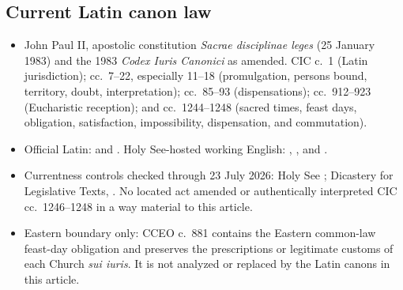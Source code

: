 \subsection*{Current Latin canon law}

{\fontsize{8.6}{9.6}\selectfont
\begin{itemize}[itemsep=0pt,parsep=0pt,topsep=0.05em]
\item John Paul II, apostolic constitution \emph{Sacrae disciplinae leges} (25 January 1983) and the 1983 \emph{Codex Iuris Canonici} as amended. CIC c.~1 (Latin jurisdiction); cc.~7--22, especially 11--18 (promulgation, persons bound, territory, doubt, interpretation); cc.~85--93 (dispensations); cc.~912--923 (Eucharistic reception); and cc.~1244--1248 (sacred times, feast days, obligation, satisfaction, impossibility, dispensation, and commutation).
\item Official Latin:  and . Holy See-hosted working English: , , and .
\item Currentness controls checked through 23 July 2026: Holy See ; Dicastery for Legislative Texts, . No located act amended or authentically interpreted CIC cc.~1246--1248 in a way material to this article.
\item Eastern boundary only: CCEO c.~881 contains the Eastern common-law feast-day obligation and preserves the prescriptions or legitimate customs of each Church \emph{sui iuris}. It is not analyzed or replaced by the Latin canons in this article.
\end{itemize}}

\endgroup
